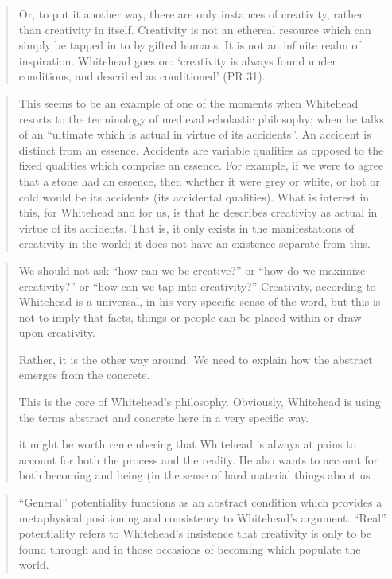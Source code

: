 \begin{quotation}
Or, to put it another way, there are only instances of creativity, rather than creativity in
itself. Creativity is not an ethereal resource which can simply be tapped in to by gifted
humans. It is not an infinite realm of inspiration. Whitehead goes on: ‘creativity is
always found under conditions, and described as conditioned’ (PR 31).
\end{quotation}


\begin{quotation}

	This seems to be an example of one of the moments when Whitehead resorts to the
terminology of medieval scholastic philosophy; when he talks of an “ultimate which is
actual in virtue of its accidents”. An accident is distinct from an essence. Accidents are
variable qualities as opposed to the fixed qualities which comprise an essence. For
example, if we were to agree that a stone had an essence, then whether it were grey or
white, or hot or cold would be its accidents (its accidental qualities). What is interest in
this, for Whitehead and for us, is that he describes creativity as actual in virtue of its
accidents. That is, it only exists in the manifestations of creativity in the world; it does
not have an existence separate from this.
\end{quotation}

\begin{quotation}
We should not ask “how can we be creative?” or “how do we maximize creativity?” or
“how can we tap into creativity?” Creativity, according to Whitehead is a universal, in
his very specific sense of the word, but this is not to imply that facts, things or people
can be placed within or draw upon creativity. 

Rather, it is the other way around. We
need to explain how the abstract emerges from the concrete. 

This is the core of
Whitehead’s philosophy. Obviously, Whitehead is using the terms abstract and
concrete here in a very specific way.

it might be worth remembering that Whitehead is always at pains to account for both
the process and the reality. He also wants to account for both becoming and being (in
the sense of hard material things about us
\end{quotation}

\begin{quotation}
“General” potentiality functions as an abstract condition which provides a metaphysical
positioning and consistency to Whitehead’s argument. “Real” potentiality refers to
Whitehead’s insistence that creativity is only to be found through and in those occasions
of becoming which populate the world.
\end{quotation}

